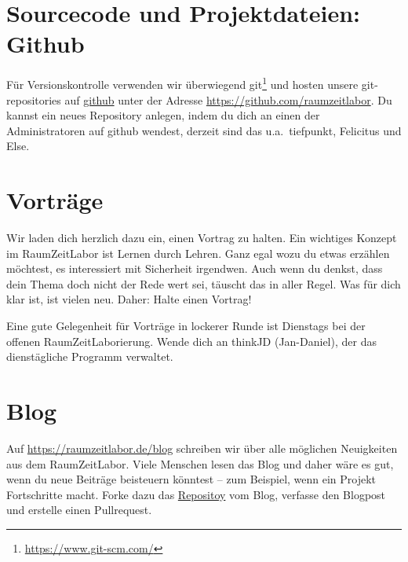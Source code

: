 \documentclass[12pt, DIV16, a4paper]{scrartcl}
\begin{document}
\section*{Sourcecode und Projektdateien: Github}

Für Versionskontrolle verwenden wir überwiegend
git\footnote{\url{https://www.git-scm.com/}} und hosten unsere git-repositories
auf \href{https://github.com/}{github} unter der Adresse
\url{https://github.com/raumzeitlabor}. Du kannst ein neues Repository anlegen,
indem du dich an einen der Administratoren auf github wendest, derzeit sind das
u.a.\ tiefpunkt, Felicitus und Else.

\section*{Vorträge}

Wir laden dich herzlich dazu ein, einen Vortrag zu halten. Ein wichtiges
Konzept im RaumZeitLabor ist Lernen durch Lehren. Ganz egal wozu du etwas
erzählen möchtest, es interessiert mit Sicherheit irgendwen. Auch wenn du
denkst, dass dein Thema doch nicht der Rede wert sei, täuscht das in aller
Regel. Was für dich klar ist, ist vielen neu. Daher: Halte einen Vortrag!
\np

Eine gute Gelegenheit für Vorträge in lockerer Runde ist Dienstags bei der
offenen RaumZeitLaborierung. Wende dich an thinkJD (Jan-Daniel), der das
dienstägliche Programm verwaltet.

\section*{Blog}

Auf \url{https://raumzeitlabor.de/blog} schreiben wir über alle möglichen
Neuigkeiten aus dem RaumZeitLabor. Viele Menschen lesen das Blog und daher wäre
es gut, wenn du neue Beiträge beisteuern könntest -- zum Beispiel, wenn ein
Projekt Fortschritte macht. Forke dazu das
\href{https://github.com/raumzeitlabor/rzl-homepage/}{Repositoy} vom Blog,
verfasse den Blogpost und erstelle einen Pullrequest.
\end{document}
